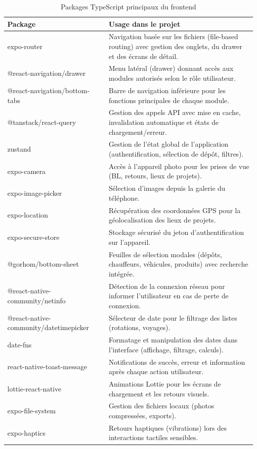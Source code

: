 \documentclass[12pt,a4paper]{article}
\begin{document}
    \begin{table}[H]
    \centering
    \renewcommand{\arraystretch}{1.3}
    \caption{Packages TypeScript principaux du frontend}
    \label{tab:packages-ts}
    \begin{tabular}{|p{4.5cm}|p{10cm}|}
    \hline
    \textbf{Package} & \textbf{Usage dans le projet} \\
    \hline
    expo-router & Navigation basée sur les fichiers (file-based routing) avec gestion des onglets, du drawer et des écrans de détail. \\
    \hline
    @react-navigation/drawer & Menu latéral (drawer) donnant accès aux modules autorisés selon le rôle utilisateur. \\
    \hline
    @react-navigation/bottom-tabs & Barre de navigation inférieure pour les fonctions principales de chaque module. \\
    \hline
    @tanstack/react-query & Gestion des appels API avec mise en cache, invalidation automatique et états de chargement/erreur. \\
    \hline
    zustand & Gestion de l'état global de l'application (authentification, sélection de dépôt, filtres). \\
    \hline
    expo-camera & Accès à l'appareil photo pour les prises de vue (BL, retours, lieux de projets). \\
    \hline
    expo-image-picker & Sélection d'images depuis la galerie du téléphone. \\
    \hline
    expo-location & Récupération des coordonnées GPS pour la géolocalisation des lieux de projets. \\
    \hline
    expo-secure-store & Stockage sécurisé du jeton d'authentification sur l'appareil. \\
    \hline
    @gorhom/bottom-sheet & Feuilles de sélection modales (dépôts, chauffeurs, véhicules, produits) avec recherche intégrée. \\
    \hline
    @react-native-community/netinfo & Détection de la connexion réseau pour informer l'utilisateur en cas de perte de connexion. \\
    \hline
    @react-native-community/datetimepicker & Sélecteur de date pour le filtrage des listes (rotations, voyages). \\
    \hline
    date-fns & Formatage et manipulation des dates dans l'interface (affichage, filtrage, calculs). \\
    \hline
    react-native-toast-message & Notifications de succès, erreur et information après chaque action utilisateur. \\
    \hline
    lottie-react-native & Animations Lottie pour les écrans de chargement et les retours visuels. \\
    \hline
    expo-file-system & Gestion des fichiers locaux (photos compressées, exports). \\
    \hline
    expo-haptics & Retours haptiques (vibrations) lors des interactions tactiles sensibles. \\
    \hline
    \end{tabular}
    \end{table}
\end{document}
